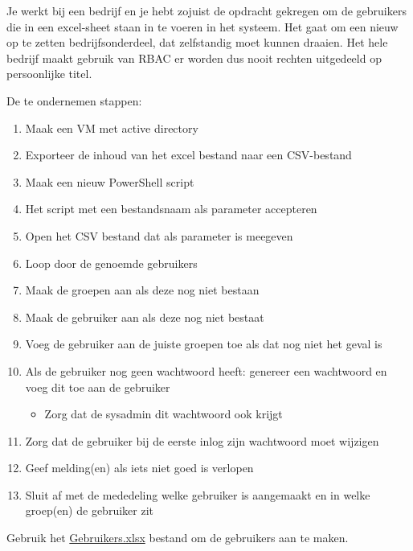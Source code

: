 Je werkt bij een bedrijf en je hebt zojuist de opdracht gekregen om de gebruikers die in een excel-sheet staan in te voeren in het systeem. Het gaat om een nieuw op te zetten bedrijfsonderdeel, dat zelfstandig moet kunnen draaien. Het hele bedrijf maakt gebruik van RBAC er worden dus nooit rechten uitgedeeld op persoonlijke titel.

De te ondernemen stappen:
\begin{enumerate}
\item Maak een VM met active directory
\item Exporteer de inhoud van het excel bestand naar een CSV-bestand
\item Maak een nieuw PowerShell script
\item Het script met een bestandsnaam als parameter accepteren
\item Open het CSV bestand dat als parameter is meegeven
\item Loop door de genoemde gebruikers
\item Maak de groepen aan als deze nog niet bestaan
\item Maak de gebruiker aan als deze nog niet bestaat
\item Voeg de gebruiker aan de juiste groepen toe als dat nog niet het geval is
\item Als de gebruiker nog geen wachtwoord heeft: genereer een wachtwoord en voeg dit toe aan de gebruiker
	\begin{itemize}
        \item Zorg dat de sysadmin dit wachtwoord ook krijgt
	\end{itemize}
\item Zorg dat de gebruiker bij de eerste inlog zijn wachtwoord moet wijzigen
\item Geef melding(en) als iets niet goed is verlopen
\item Sluit af met de mededeling welke gebruiker is aangemaakt en in welke groep(en) de gebruiker zit
\end{enumerate}

Gebruik het \url{Gebruikers.xlsx} bestand om de gebruikers aan te maken.

